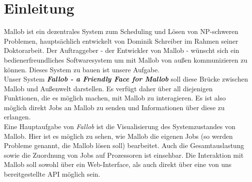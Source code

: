 \section{Einleitung}



Mallob ist ein dezentrales System zum Scheduling und Lösen von NP-schweren Problemen, hauptsächlich entwickelt von Dominik Schreiber im Rahmen seiner Doktorarbeit. Der Auftraggeber - der Entwickler von Mallob - wünscht sich ein bedienerfreundliches Softwaresystem um mit Mallob von außen kommunizieren zu können. Dieses System zu bauen ist unsere Aufgabe.\\
Unser System \textbf{\textit{Fallob - a Friendly Face for Mallob}} soll diese Brücke zwischen Mallob und Außenwelt darstellen.
Es verfügt daher über all diejenigen Funktionen, die es möglich machen, mit Mallob zu interagieren. Es ist also möglich direkt Jobs an Mallob zu senden und Informationen über diese zu erlangen.\\
Eine Hauptaufgabe von \textit{Fallob} ist die Visualisierung des Systemzustandes von Mallob. Hier ist es möglich zu sehen, wie Mallob die eigenen Jobs (so werden Probleme genannt, die Mallob lösen soll) bearbeitet. Auch die Gesamtauslastung sowie die Zuordnung von Jobs auf Prozessoren ist einsehbar. 
Die Interaktion mit Mallob soll sowohl über ein Web-Interface, als auch direkt über eine von uns bereitgestellte API möglich sein. %




